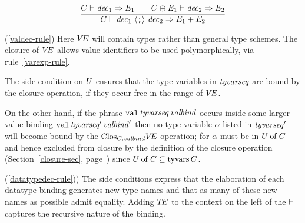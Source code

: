 \begin{equation}        %
\frac{\C\ts\dec_1\ra\E_1\qquad\C\oplus\E_1\ts\dec_2\ra\E_2}
     {\C\ts\seqdec\ra\plusmap{E_1}{E_2}}
\end{equation}
\comments
\begin{description}

\item{(\ref{valdec-rule})}
Here $\mbox{$V\!E$}$ will contain types rather than general
type schemes.
The closure of $\mbox{$V\!E$}$  
allows value identifiers  to
be used polymorphically, via rule~\ref{varexp-rule}.

The side-condition on $U$
ensures that the type variables in ${\it tyvarseq}$  are bound 
by the closure operation,
if they occur free in the range of $\mbox{$V\!E$}$.

On the other hand,
if the phrase $\hbox{\tt val}\,{\it tyvarseq}\,{\it valbind}$ occurs inside
some larger value binding $\hbox{\tt val}\,{\it tyvarseq}'\,{\it valbind}'$
then no type variable $\alpha$ listed in ${\it tyvarseq}'$ will become
bound by the ${\rm Clos}_{C,{\it valbind}}\mbox{$V\!E$}$ operation; for $\alpha$ must 
be in $U \mathbin{\rm of} C$ and hence excluded from closure by the definition of the closure operation
(Section~\ref{closure-sec}, page~\pageref{clos-def-lab})
since $U \mathbin{\rm of} C\subseteq\mathop{\rm tyvars}\nolimits C$.

\begin{center}
\end{center}%

\item{(\ref{datatypedec-rule})\CUT{,(\ref{abstypedec-rule}})}
The side conditions
express that the elaboration of each datatype binding
generates new type names and that as many of these new names
as possible admit equality.  Adding $\mbox{$T\!E$}$ to the context on the left
of the $\vdash$ captures the recursive nature of the binding.


\end{description}
